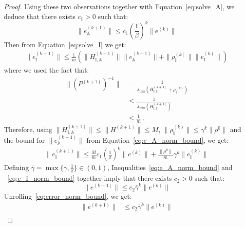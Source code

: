 \documentclass[letterpaper, 10 pt, conference]{ieeeconf}  %
\begin{document}
\begin{proof}
Using these two observations together with Equation~\eqref{eq:solve_A}, we deduce that there exists $c_1 > 0$ such that:
\begin{equation}
\label{eq:e_A_norm_bound}
\|e_{\mathbb{A}}^{(k+1)}\| \leq c_1 \left(\frac{1}{\beta}\right)^{k} \|e^{(k)}\|
\end{equation}
Then from Equation~\eqref{eq:solve_I} we get:
\begin{equation}
\begin{aligned}
        \|e_{\mathbb{I}}^{(k+1)}\| \leq \frac{1}{m} \left( \|H_{\mathbb{I},\mathbb{A}}^{(k+1)}\| \|e_{\mathbb{A}}^{(k+1)}\|
        +  \|\rho_{\mathbb{I}}^{(k)}\|\|e_{\mathbb{I}}^{(k)}\|\right)
\end{aligned}
\end{equation}
where we used the fact that:
\begin{equation}
\begin{aligned}
    \|\left( P^{(k+1)} \right)^{-1}\| &= \frac{1}{\lambda_{\min}\left(H_{\mathbb{I}, \mathbb{I}}^{(k+1)} + \rho_{\mathbb{I}}^{(k)}\right)}\\
    &\leq \frac{1}{\lambda_{\min}\left( H_{\mathbb{I}, \mathbb{I}}^{(k+1)} \right)} \\
    &\leq \frac{1}{m} \,.
\end{aligned}
\end{equation}
Therefore, using $\|H^{(k+1)}_{\mathbb{I}, \mathbb{A}} \| \leq \|H^{(k+1)}\| \leq M$, $\|\rho_{\mathbb{I}}^{(k)}\| \leq \gamma^k \|\rho^0\|$ and the bound for $\|e_{\mathbb{A}}^{(k+1)}\|$ from Equation~\eqref{eq:e_A_norm_bound}, we get:
\begin{equation}
\label{eq:e_I_norm_bound}
\begin{aligned}
    \|e_{\mathbb{I}}^{(k+1)}\| \leq \frac{M}{m} c_1 \left(\frac{1}{\beta}\right)^k \|e^{(k)}\| + \frac{\|\rho^0\|}{m} \gamma^k \|e_{\mathbb{I}}^{(k)}\|
\end{aligned}
\end{equation}
Defining $\bar{\gamma} = \max\{\gamma, \frac{1}{\beta}\} \in (0,1)$, Inequalities~\eqref{eq:e_A_norm_bound} and ~\eqref{eq:e_I_norm_bound} together imply that there exists $c_2>0$ such that:
\begin{equation}
    \label{eq:error_norm_bound}
    \|e^{(k+1)}\| \leq c_2 \bar{\gamma}^k \|e^{(k)}\|
\end{equation}
Unrolling~\eqref{eq:error_norm_bound}, we get:
\begin{equation}
    \begin{aligned}
        \|e^{(k+1)}\| &\leq c_2 \bar{\gamma}^k \|e^{(k)}\| \\

\end{aligned}
\end{equation}
\end{proof}
\end{document}
